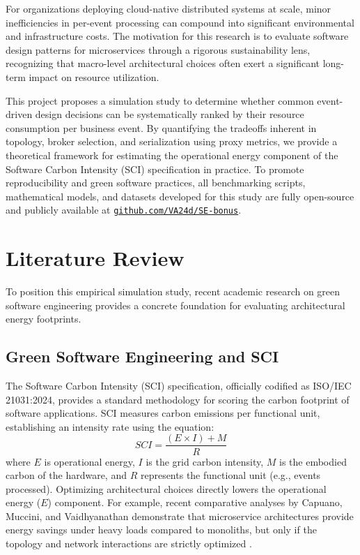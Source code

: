 \documentclass[conference]{IEEEtran}
\begin{document}
For organizations deploying cloud-native distributed systems at scale, minor inefficiencies in per-event processing can compound into significant environmental and infrastructure costs. The motivation for this research is to evaluate software design patterns for microservices through a rigorous sustainability lens, recognizing that macro-level architectural choices often exert a significant long-term impact on resource utilization.

This project proposes a simulation study to determine whether common event-driven design decisions can be systematically ranked by their resource consumption per business event. By quantifying the tradeoffs inherent in topology, broker selection, and serialization using proxy metrics, we provide a theoretical framework for estimating the operational energy component of the Software Carbon Intensity (SCI) specification in practice. To promote reproducibility and green software practices, all benchmarking scripts, mathematical models, and datasets developed for this study are fully open-source and publicly available at \href{https://github.com/VA24d/SE-bonus}{\texttt{github.com/VA24d/SE-bonus}}.

\section{Literature Review}
To position this empirical simulation study, recent academic research on green software engineering provides a concrete foundation for evaluating architectural energy footprints.

\subsection{Green Software Engineering and SCI}
The Software Carbon Intensity (SCI) specification, officially codified as ISO/IEC 21031:2024, provides a standard methodology for scoring the carbon footprint of software applications. SCI measures carbon emissions per functional unit, establishing an intensity rate using the equation:
\begin{equation}
    SCI = \frac{(E \times I) + M}{R}
\end{equation}
where $E$ is operational energy, $I$ is the grid carbon intensity, $M$ is the embodied carbon of the hardware, and $R$ represents the functional unit (e.g., events processed). Optimizing architectural choices directly lowers the operational energy ($E$) component. For example, recent comparative analyses by Capuano, Muccini, and Vaidhyanathan demonstrate that microservice architectures provide energy savings under heavy loads compared to monoliths, but only if the topology and network interactions are strictly optimized \cite{b1, b2}.
\end{document}

